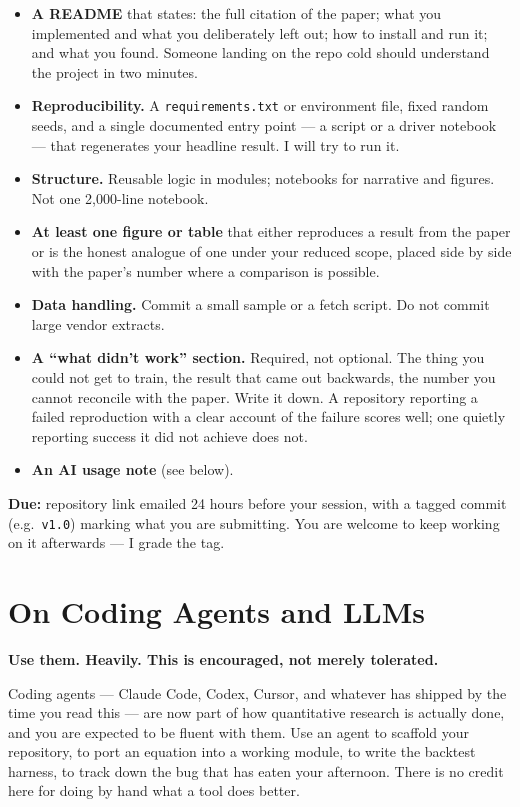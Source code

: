 \documentclass[11pt]{article}
\begin{document}
\begin{itemize}
  \item \textbf{A README} that states: the full citation of the paper; what you
    implemented and what you deliberately left out; how to install and run it;
    and what you found. Someone landing on the repo cold should understand the
    project in two minutes.
  \item \textbf{Reproducibility.} A \texttt{requirements.txt} or environment
    file, fixed random seeds, and a single documented entry point --- a script
    or a driver notebook --- that regenerates your headline result. I will try
    to run it.
  \item \textbf{Structure.} Reusable logic in modules; notebooks for narrative
    and figures. Not one 2{,}000-line notebook.
  \item \textbf{At least one figure or table} that either reproduces a result
    from the paper or is the honest analogue of one under your reduced scope,
    placed side by side with the paper's number where a comparison is possible.
  \item \textbf{Data handling.} Commit a small sample or a fetch script. Do not
    commit large vendor extracts.
  \item \textbf{A ``what didn't work'' section.} Required, not optional. The
    thing you could not get to train, the result that came out backwards, the
    number you cannot reconcile with the paper. Write it down. A repository
    reporting a failed reproduction with a clear account of the failure scores
    well; one quietly reporting success it did not achieve does not.
  \item \textbf{An AI usage note} (see below).
\end{itemize}

\noindent
\textbf{Due:} repository link emailed 24 hours before your session, with a
tagged commit (e.g.\ \texttt{v1.0}) marking what you are submitting. You are
welcome to keep working on it afterwards --- I grade the tag.

\section*{On Coding Agents and LLMs}

\textbf{Use them. Heavily. This is encouraged, not merely tolerated.}

Coding agents --- Claude Code, Codex, Cursor, and whatever has shipped by the
time you read this --- are now part of how quantitative research is actually
done, and you are expected to be fluent with them. Use an agent to scaffold
your repository, to port an equation into a working module, to write the
backtest harness, to track down the bug that has eaten your afternoon. There is
no credit here for doing by hand what a tool does better.
\end{document}
